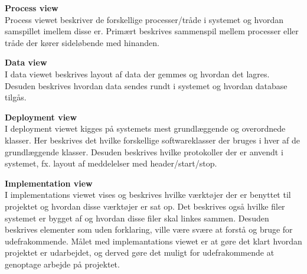 \textbf{Process view}\\
Process viewet beskriver de forskellige processer/tråde i systemet og hvordan samspillet imellem disse er. Primært beskrives sammenspil mellem processer eller tråde der kører sideløbende med hinanden.

\textbf{Data view}\\
I data viewet beskrives layout af data der gemmes og hvordan det lagres. Desuden beskrives hvordan data sendes rundt i systemet og hvordan database tilgås. 

\textbf{Deployment view}\\
I deployment viewet kigges på systemets mest grundlæggende og overordnede klasser. Her beskrives det hvilke forskellige softwareklasser der bruges i hver af de grundlæggende klasser. Desuden beskrives hvilke protokoller der er anvendt i systemet, fx. layout af meddelelser med header/start/stop.   

\textbf{Implementation view}\\
I implementations viewet vises og beskrives hvilke værktøjer der er benyttet til projektet og hvordan disse værktøjer er sat op. Det beskrives også hvilke filer systemet er bygget af og hvordan disse filer skal linkes sammen. 
Desuden beskrives elementer som uden forklaring, ville være svære at forstå og bruge for udefrakommende. Målet med implemantations viewet er at gøre det klart hvordan projektet er udarbejdet, og derved gøre det muligt for udefrakommende at genoptage arbejde på projektet.


